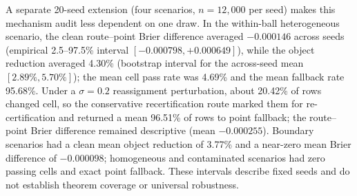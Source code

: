 \documentclass[11pt,a4paper]{article}
\numberwithin{equation}{section}
\theoremstyle{definition}\newtheorem{definition}[theorem]{Definition}
\theoremstyle{remark}\newtheorem{remark}[theorem]{Remark}
\begin{document}
A separate 20-seed extension (four scenarios, $n=12,000$ per seed) makes this
mechanism audit less dependent on one draw. In the within-ball heterogeneous
scenario, the clean route--point Brier difference averaged $-0.000146$ across
seeds (empirical 2.5--97.5\% interval $[-0.000798,+0.000649]$), while the object
reduction averaged 4.30\% (bootstrap interval for the across-seed mean
$[2.89\%,5.70\%]$); the mean cell pass rate was 4.69\% and the mean fallback
rate 95.68\%. Under a $\sigma=0.2$ reassignment perturbation, about 20.42\% of rows
changed cell, so the conservative recertification route marked them for
re-certification and returned a mean 96.51\% of rows to point fallback; the
route--point Brier difference remained descriptive (mean $-0.000255$). Boundary
scenarios had a clean mean object reduction of 3.77\% and a near-zero mean
Brier difference of $-0.000098$; homogeneous and contaminated scenarios had
zero passing cells and exact point fallback. These intervals describe fixed
seeds and do not establish theorem coverage or universal robustness.
\end{document}
